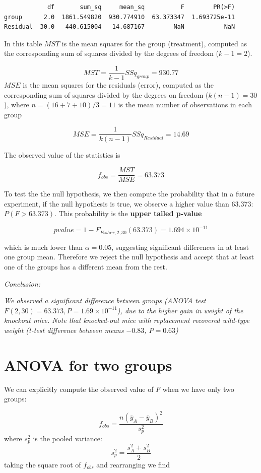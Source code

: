 \documentclass[
]{book}
\begin{document}
\begin{verbatim}
            df       sum_sq     mean_sq          F        PR(>F)
group      2.0  1861.549820  930.774910  63.373347  1.693725e-11
Residual  30.0   440.615004   14.687167        NaN           NaN
\end{verbatim}

In this table \(MST\) is the mean squares for the group (treatment), computed as the corresponding sum of squares divided by the degrees of freedom (\(k-1=2\)).

\[MST=\frac{1}{k-1}SSq_{group}=930.77\]
\(MSE\) is the mean squares for the residuals (error), computed as the corresponding sum of squares divided by the degrees on freedom (\(k(n-1)=30\)), where \(n=(16 + 7 + 10)/3=11\) is the mean number of observations in each group

\[MSE=\frac{1}{k(n-1)}SSq_{Residual}=14.69\]

The observed value of the statistics is

\[f_{obs}=\frac{MST}{MSE}=63.373\]

To test the the null hypothesis, we then compute the probability that in a future experiment, if the null hypothesis is true, we observe a higher value than \(63.373\): \(P(F>63.373)\). This probability is the \textbf{upper tailed p-value}

\[pvalue=1-F_{Fisher,2,30}(63.373)=1.694 \times 10^{-11}\]

which is much lower than \(\alpha=0.05\), suggesting significant differences in at least one group mean. Therefore we reject the null hypothesis and accept that at least one of the groups has a different mean from the rest.

\emph{Conclusion:}

\emph{We observed a significant difference between groups (ANOVA test \(F(2,30)=63.373, P= 1.69 \times 10^{-11}\)), due to the higher gain in weight of the knockout mice. Note that knocked-out mice with replacement recovered wild-type weight (t-test difference between means \(-0.83\), \(P=0.63\))}

\hypertarget{anova-for-two-groups}{%
\section{ANOVA for two groups}\label{anova-for-two-groups}}

We can explicitly compute the observed value of \(F\) when we have only two groups:

\[f_{obs}=\frac{n(\bar{y}_{A}-\bar{y}_{B})^2}{s^2_p}\]
where \(s^2_p\) is the pooled variance:
\[s^2_p= \frac{s_A^2 + s_B^2}{{2}}\]
taking the square root of \(f_{obs}\) and rearranging we find
\end{document}
